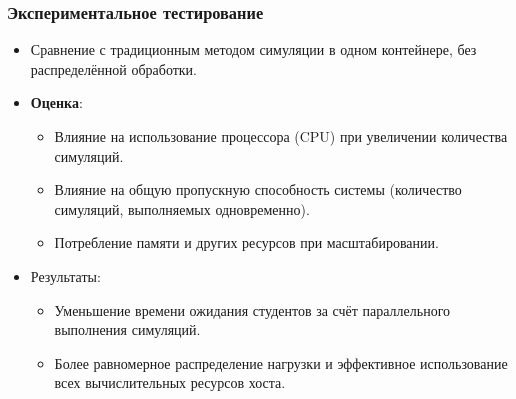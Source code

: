 \documentclass{beamer}
\begin{document}
\begin{frame}[fragile]
  \frametitle{Экспериментальное тестирование}
  \begin{itemize}
    \item Сравнение с традиционным методом симуляции в одном контейнере, без распределённой обработки.
    \item \textbf{Оценка}:
    \begin{itemize}
      \item Влияние на использование процессора (CPU) при увеличении количества симуляций.
      \item Влияние на общую пропускную способность системы (количество симуляций, выполняемых одновременно).
      \item Потребление памяти и других ресурсов при масштабировании.
    \end{itemize}
    \item Результаты:
    \begin{itemize}
      \item Уменьшение времени ожидания студентов за счёт параллельного выполнения симуляций.
      \item Более равномерное распределение нагрузки и эффективное использование всех вычислительных ресурсов хоста.
    \end{itemize}
  \end{itemize}
\end{frame}
\end{document}
